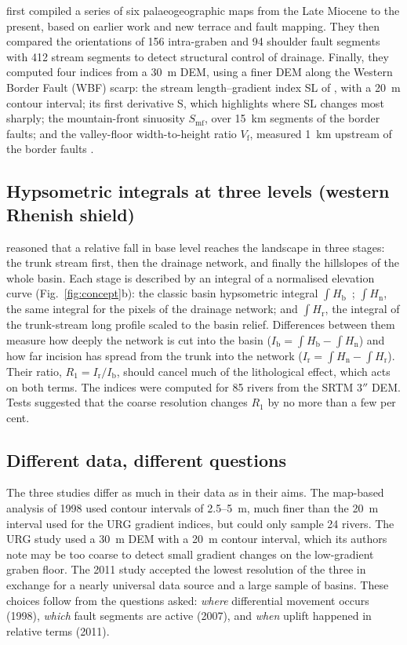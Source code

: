 \documentclass[10pt,a4paper,twocolumn]{article}
\newcommand{\Hb}{\ensuremath{\int\!H_\mathrm{b}}}
\newcommand{\Hn}{\ensuremath{\int\!H_\mathrm{n}}}
\newcommand{\Hr}{\ensuremath{\int\!H_\mathrm{r}}}
\begin{document}
\citet{PetersVanBalen2007} first compiled a series of six palaeogeographic maps from the Late Miocene to
the present, based on earlier work and new terrace and fault mapping. They then compared the
orientations of 156 intra-graben and 94 shoulder fault segments with 412 stream segments to detect
structural control of drainage. Finally, they computed four indices from a 30~m DEM, using a finer
DEM along the Western Border Fault (WBF) scarp: the stream length--gradient index SL of
\citet{Hack1973}, with a 20~m contour interval; its first derivative S, which highlights where SL
changes most sharply; the mountain-front sinuosity $S_\mathrm{mf}$, over 15~km segments of the border
faults; and the valley-floor width-to-height ratio $V_\mathrm{f}$, measured 1~km upstream of the border
faults \citep{BullMcFadden1977}.

\subsection{Hypsometric integrals at three levels (western Rhenish shield)}

\citet{Demoulin2011} reasoned that a relative fall in base level reaches the landscape in three stages:
the trunk stream first, then the drainage network, and finally the hillslopes of the whole basin. Each
stage is described by an integral of a normalised elevation curve (Fig.~\ref{fig:concept}b): the
classic basin hypsometric integral \Hb\ \citep{Strahler1952}; \Hn, the same integral for the pixels of
the drainage network; and \Hr, the integral of the trunk-stream long profile scaled to the basin relief.
Differences between them measure how deeply the network is cut into the basin
($I_\mathrm{b}=\Hb-\Hn$) and how far incision has spread from the trunk into the network
($I_\mathrm{r}=\Hn-\Hr$). Their ratio, $R_1=I_\mathrm{r}/I_\mathrm{b}$, should cancel much of the
lithological effect, which acts on both terms. The indices were computed for 85 rivers from the SRTM
3$''$ DEM. Tests suggested that the coarse resolution changes $R_1$ by no more than a few per cent.

\subsection{Different data, different questions}

The three studies differ as much in their data as in their aims. The map-based analysis of 1998 used
contour intervals of 2.5--5~m, much finer than the 20~m interval used for the URG gradient indices,
but could only sample 24 rivers.
The URG study used a 30~m DEM with a 20~m contour interval, which its authors note may be too coarse to
detect small gradient changes on the low-gradient graben floor. The 2011 study accepted the
lowest resolution of the three in exchange for a nearly universal data source and a large sample of
basins. These choices follow from the questions asked: \textit{where} differential movement occurs
(1998), \textit{which} fault segments are active (2007), and \textit{when} uplift happened in relative
terms (2011).
\end{document}
